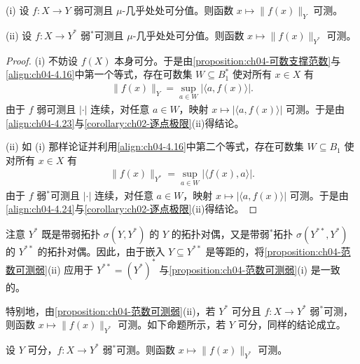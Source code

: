 \documentclass[../../main.tex]{subfiles}%
\begin{document}
\begin{proposition}\label{proposition:ch04-范数可测弱}
(i) 设 $f:X\to Y$ 弱可测且 $\mu$-几乎处处可分值。则函数 $x\mapsto\|f(x)\|_Y$ 可测。

(ii) 设 $f:X\to Y^*$ 弱$^*$可测且 $\mu$-几乎处处可分值。则函数 $x\mapsto\|f(x)\|_{Y^*}$ 可测。
\end{proposition}

\begin{proof}
(i) 不妨设 $f(X)$ 本身可分。于是由\cref{proposition:ch04-可数支撑范数}与\eqref{align:ch04-4.16}中第一个等式，存在可数集 $W\subseteq B_1^*$ 使对所有 $x\in X$ 有
\begin{align}
\|f(x)\|_Y=\sup_{a\in W}|\langle a,f(x)\rangle|. \label{align:ch04-4.23}
\end{align}
由于 $f$ 弱可测且 $|\cdot|$ 连续，对任意 $a\in W$，映射 $x\mapsto|\langle a,f(x)\rangle|$ 可测。于是由\eqref{align:ch04-4.23}与\cref{corollary:ch02-逐点极限}(ii)得结论。

(ii) 如 (i) 那样论证并利用\eqref{align:ch04-4.16}中第二个等式，存在可数集 $W\subseteq B_1$ 使对所有 $x\in X$ 有
\begin{align}
\|f(x)\|_{Y^*}=\sup_{a\in W}|\langle f(x),a\rangle|. \label{align:ch04-4.24}
\end{align}
由于 $f$ 弱$^*$可测且 $|\cdot|$ 连续，对任意 $a\in W$，映射 $x\mapsto|\langle a,f(x)\rangle|$ 可测。于是由\eqref{align:ch04-4.24}与\cref{corollary:ch02-逐点极限}(ii)得结论。
\end{proof}

\begin{remark}\label{remark:ch04-对偶注}
注意 $Y^*$ 既是带弱拓扑 $\sigma(Y,Y^*)$ 的 $Y$ 的拓扑对偶，又是带弱$^*$拓扑 $\sigma(Y^{**},Y^*)$ 的 $Y^{**}$ 的拓扑对偶。因此，由于嵌入 $Y\subseteq Y^{**}$ 是等距的，将\cref{proposition:ch04-范数可测弱}(ii) 应用于 $Y^{**}=(Y^*)^*$ 与\cref{proposition:ch04-范数可测弱}(i) 是一致的。

特别地，由\cref{proposition:ch04-范数可测弱}(ii)，若 $Y^*$ 可分且 $f:X\to Y^*$ 弱$^*$可测，则函数 $x\mapsto\|f(x)\|_{Y^*}$ 可测。如下命题所示，若 $Y$ 可分，同样的结论成立。
\end{remark}

\begin{proposition}\label{proposition:ch04-弱星范数可测}\label{proposition:ch04-有界密度}
设 $Y$ 可分，$f:X\to Y^*$ 弱$^*$可测。则函数 $x\mapsto\|f(x)\|_{Y^*}$ 可测。
\end{proposition}
\end{document}
